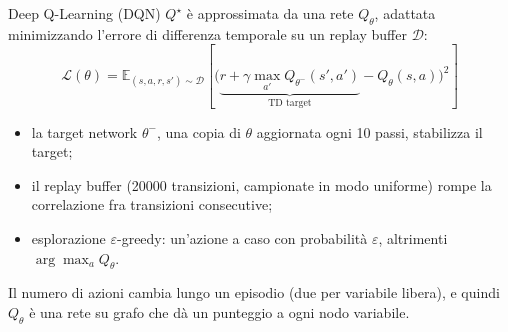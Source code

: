 \documentclass[aspectratio=169]{beamer}
\newcommand{\T}[2]{#2}
\newcommand{\T}[2]{#1}
\begin{document}
\begin{frame}{Deep Q-Learning (DQN)}
  \T{$Q^\star$ is approximated by a network $Q_\theta$, fitted by minimizing the
  temporal-difference error over a replay buffer $\mathcal D$:}%
  {$Q^\star$ \`e approssimata da una rete $Q_\theta$, adattata minimizzando l'errore di
  differenza temporale su un replay buffer $\mathcal D$:}
  \[
    \mathcal L(\theta)=\mathbb E_{(s,a,r,s')\sim\mathcal D}\!\left[
      \Big(\underbrace{r+\gamma\max_{a'}Q_{\theta^-}(s',a')}_{\text{TD target}}-Q_\theta(s,a)\Big)^{2}
    \right]
  \]
  \begin{itemize}
    \item \T{the target network $\theta^-$, a copy of $\theta$ refreshed every 10 updates,
          stabilizes the target;}%
          {la target network $\theta^-$, una copia di $\theta$ aggiornata ogni 10 passi,
          stabilizza il target;}
    \item \T{the replay buffer (20000 transitions, sampled uniformly) breaks the correlation
          between consecutive transitions;}%
          {il replay buffer (20000 transizioni, campionate in modo uniforme) rompe la
          correlazione fra transizioni consecutive;}
    \item \T{$\varepsilon$-greedy exploration: a random action with probability
          $\varepsilon$, otherwise $\arg\max_a Q_\theta$.}%
          {esplorazione $\varepsilon$-greedy: un'azione a caso con probabilit\`a
          $\varepsilon$, altrimenti $\arg\max_a Q_\theta$.}
  \end{itemize}
  \T{The number of actions changes along an episode (two per unassigned variable), and
  hence $Q_\theta$ is a graph network that scores each variable node.}%
  {Il numero di azioni cambia lungo un episodio (due per variabile libera), e quindi
  $Q_\theta$ \`e una rete su grafo che d\`a un punteggio a ogni nodo variabile.}
\end{frame}
\end{document}
